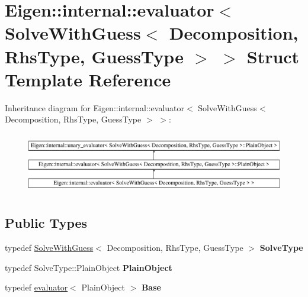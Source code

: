 \hypertarget{struct_eigen_1_1internal_1_1evaluator_3_01_solve_with_guess_3_01_decomposition_00_01_rhs_type_00_01_guess_type_01_4_01_4}{}\section{Eigen\+::internal\+::evaluator$<$ Solve\+With\+Guess$<$ Decomposition, Rhs\+Type, Guess\+Type $>$ $>$ Struct Template Reference}
\label{struct_eigen_1_1internal_1_1evaluator_3_01_solve_with_guess_3_01_decomposition_00_01_rhs_type_00_01_guess_type_01_4_01_4}
Inheritance diagram for Eigen\+::internal\+::evaluator$<$ Solve\+With\+Guess$<$ Decomposition, Rhs\+Type, Guess\+Type $>$ $>$\+:\begin{figure}[H]
\begin{center}
\leavevmode
\includegraphics[height=2.705314cm]{struct_eigen_1_1internal_1_1evaluator_3_01_solve_with_guess_3_01_decomposition_00_01_rhs_type_00_01_guess_type_01_4_01_4}
\end{center}
\end{figure}
\subsection*{Public Types}
\begin{DoxyCompactItemize}
\item 
\mbox{\label{struct_eigen_1_1internal_1_1evaluator_3_01_solve_with_guess_3_01_decomposition_00_01_rhs_type_00_01_guess_type_01_4_01_4_a9c151650d30e65e40dc5597afd45ef7c}} 
typedef \mbox{\hyperlink{class_eigen_1_1_solve_with_guess}{Solve\+With\+Guess}}$<$ Decomposition, Rhs\+Type, Guess\+Type $>$ {\bfseries Solve\+Type}
\item 
\mbox{\label{struct_eigen_1_1internal_1_1evaluator_3_01_solve_with_guess_3_01_decomposition_00_01_rhs_type_00_01_guess_type_01_4_01_4_ac987c6d88c17629106d75b49e46324f9}} 
typedef Solve\+Type\+::\+Plain\+Object {\bfseries Plain\+Object}
\item 
\mbox{\label{struct_eigen_1_1internal_1_1evaluator_3_01_solve_with_guess_3_01_decomposition_00_01_rhs_type_00_01_guess_type_01_4_01_4_a306d5ed1ce0403c786c359b174d7e8e0}} 
typedef \mbox{\hyperlink{struct_eigen_1_1internal_1_1evaluator}{evaluator}}$<$ Plain\+Object $>$ {\bfseries Base}
\end{DoxyCompactItemize}

